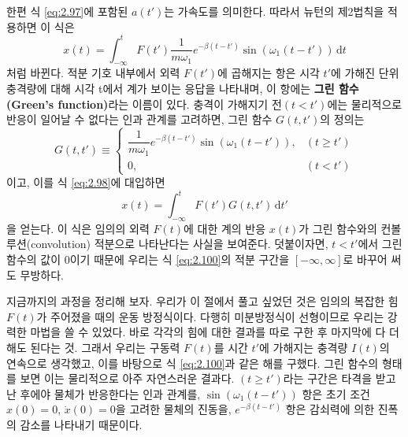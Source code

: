 \documentclass[chapter, oneside, b5paper]{oblivoir}
\theoremstyle{plain}
\theoremstyle{definition}
\theoremstyle{remark}
\begin{document}
한편 식 \ref{eq:2.97}에 포함된 $a(t')$는 가속도를 의미한다. 따라서 뉴턴의 제2법칙을 적용하면 이 식은
\begin{equation}
    x(t) = \int_{-\infty}^{t} F(t')\frac{1}{m\omega_1} e^{-\beta (t-t')} \sin(\omega_1 (t-t'))\, \mathrm{d}t \label{eq:2.98}
\end{equation}
처럼 바뀐다. 적분 기호 내부에서 외력 $F(t')$에 곱해지는 항은 시각 $t'$에 가해진 단위 충격량에 대해 시각 t에서 계가 보이는 응답을 나타내며, 이 항에는 \textbf{그린 함수(Green's function)}라는 이름이 있다. 충격이 가해지기 전$(t < t')$에는 물리적으로 반응이 일어날 수 없다는 인과 관계를 고려하면, 그린 함수 $G(t, t')$의 정의는
\begin{equation}
    G(t, t') \equiv \begin{cases} \dfrac{1}{m\omega_1} e^{-\beta(t-t')} \sin{(\omega_1 (t-t'))}, & (t \ge t') \\ 0, & (t < t') \end{cases} \label{eq:2.99}
\end{equation}이고, 이를 식 \ref{eq:2.98}에 대입하면
\begin{equation}
    x(t) = \int_{-\infty}^{t} F(t') G(t, t') \, \mathrm{d}t'
    \label{eq:2.100}
\end{equation}
을 얻는다. 이 식은 임의의 외력 $F(t)$에 대한 계의 반응 $x(t)$가 그린 함수와의 컨볼루션(convolution) 적분으로 나타난다는 사실을 보여준다. 덧붙이자면, $t < t'$에서 그린 함수의 값이 0이기 때문에 우리는 식 \ref{eq:2.100}의 적분 구간을 $[-\infty, \infty]$로 바꾸어 써도 무방하다.

지금까지의 과정을 정리해 보자. 우리가 이 절에서 풀고 싶었던 것은 임의의 복잡한 힘 $F(t)$가 주어졌을 때의 운동 방정식이다. 다행히 미분방정식이 선형이므로 우리는 강력한 마법을 쓸 수 있었다. 바로 각각의 힘에 대한 결과를 따로 구한 후 마지막에 다 더해도 된다는 것. 그래서 우리는 구동력 $F(t)$를 시간 $t'$에 가해지는 충격량 $I(t)$의 연속으로 생각했고, 이를 바탕으로 식 \ref{eq:2.100}과 같은 해를 구했다. 그린 함수의 형태를 보면 이는 물리적으로 아주 자연스러운 결과다. $(t \ge t')$라는 구간은 타격을 받고 난 후에야 물체가 반응한다는 인과 관계를, $\sin{(\omega_1 (t-t'))}$ 항은 초기 조건 $x(0)=0$, $\dot{x}(0)=0$을 고려한 물체의 진동을, $e^{-\beta(t-t')}$ 항은 감쇠력에 의한 진폭의 감소를 나타내기 때문이다.
\end{document}

